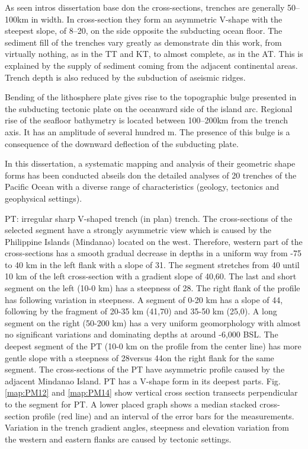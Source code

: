 \documentclass[11pt,a4paper]{report}
\begin{document}
{As seen intros dissertation base don the cross-sections, trenches are generally 50--100km in width. In cross-section they form an asymmetric V-shape with the steepest slope, of 8--20\degree, on the side opposite the subducting ocean floor. The sediment fill of the trenches vary greatly as demonstrate din this work, from virtually nothing, as in the \ac{TT} and \ac{KT}, to almost complete, as in the \ac{AT}. This is explained by the supply of sediment coming from the adjacent continental areas. Trench depth is also reduced by the subduction of aseismic ridges.

Bending of the lithosphere plate gives rise to the topographic bulge presented in the subducting tectonic plate on the oceanward side of the island arc. Regional rise of the seafloor bathymetry is located between 100--200km from the trench axis. It has an amplitude of several hundred m. The presence of this bulge is a consequence of the downward deflection of the subducting plate.

In this dissertation, a systematic mapping and analysis of their geometric shape forms has been conducted abseils don the detailed analyses of 20 trenches of the Pacific Ocean with a diverse range of characteristics (geology, tectonics and geophysical settings). 

\ac{PT}: irregular sharp V-shaped trench (in plan) trench. The cross-sections of the selected segment have a strongly asymmetric view which is caused by the Philippine Islands (Mindanao) located on the west. Therefore, western part of the cross-sections has a smooth gradual decrease in depths in a uniform way from -75 to 40 km in the left flank with a slope of 31\degree. The  segment stretches from 40 until 10 km of the left cross-section with a gradient slope of 40,60\degree. The last and short segment on the left (10-0 km) has a steepness of 28\degree. The right flank of the profile has following variation in steepness. A segment of 0-20 km has a slope of 44\degree, following by the fragment of 20-35 km (41,70\degree) and 35-50 km (25,0\degree). A long segment on the right (50-200 km) has a very uniform geomorphology with almost no significant variations and dominating depths at around -6,000 \ac{BSL}. The deepest segment of the \ac{PT}  (10-0 km on the profile from the center line) has more gentle slope with a steepness of 28\degree versus 44\degree on the right flank for the same segment. The cross-sections of the \ac{PT} have asymmetric profile caused by the adjacent Mindanao Island. \ac{PT} has a V-shape form in its deepest parts. Fig. \ref{map:PM12} and \ref{map:PM14} show vertical cross section transects perpendicular to the segment for \ac{PT}. A lower placed graph shows a median stacked cross-section profile (red line) and an interval of the error bars for the measurements. Variation in the trench gradient angles, steepness and elevation variation from the western and eastern flanks are caused by tectonic settings. 

}
\end{document}
